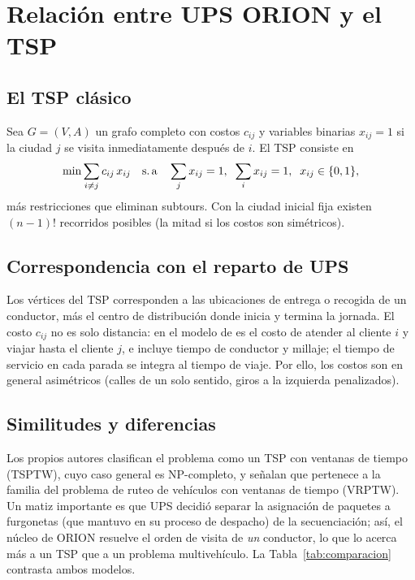 \documentclass[11pt,a4paper]{article}
\begin{document}
\section{Relación entre UPS ORION y el TSP}
\subsection{El TSP clásico}
Sea $G=(V,A)$ un grafo completo con costos $c_{ij}$ y variables binarias $x_{ij}=1$ si la ciudad $j$ se visita inmediatamente después de $i$. El TSP consiste en
\begin{equation}
\min \sum_{i\neq j} c_{ij}\,x_{ij}
\quad\text{s.\,a}\quad
\sum_{j} x_{ij}=1,\;\; \sum_{i} x_{ij}=1,\;\; x_{ij}\in\{0,1\},
\label{eq:tsp}
\end{equation}
más restricciones que eliminan subtours. Con la ciudad inicial fija existen $(n-1)!$ recorridos posibles (la mitad si los costos son simétricos).

\subsection{Correspondencia con el reparto de UPS}
Los vértices del TSP corresponden a las ubicaciones de entrega o recogida de un conductor, más el centro de distribución donde inicia y termina la jornada. El costo $c_{ij}$ no es solo distancia: en el modelo de \textcite{holland2017} es el costo de atender al cliente $i$ y viajar hasta el cliente $j$, e incluye tiempo de conductor y millaje; el tiempo de servicio en cada parada se integra al tiempo de viaje. Por ello, los costos son en general asimétricos (calles de un solo sentido, giros a la izquierda penalizados).

\subsection{Similitudes y diferencias}
Los propios autores clasifican el problema como un TSP con ventanas de tiempo (TSPTW), cuyo caso general es NP-completo, y señalan que pertenece a la familia del problema de ruteo de vehículos con ventanas de tiempo (VRPTW). Un matiz importante es que UPS decidió separar la asignación de paquetes a furgonetas (que mantuvo en su proceso de despacho) de la secuenciación; así, el núcleo de ORION resuelve el orden de visita de \emph{un} conductor, lo que lo acerca más a un TSP que a un problema multivehículo. La Tabla~\ref{tab:comparacion} contrasta ambos modelos.
\end{document}
